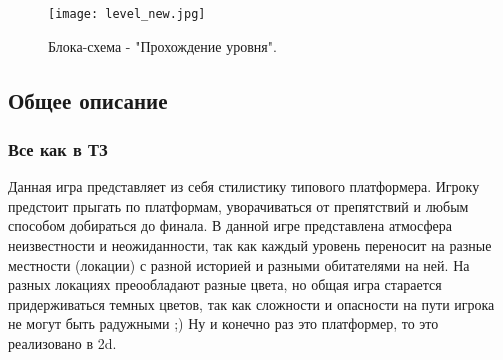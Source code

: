 \documentclass[a4paper,12pt]{article}
\begin{document}
    \begin{figure}[H] %
    \centering
    \texttt{[image: level\_new.jpg]} %
    \caption{Блока-схема - "Прохождение уровня".}
    \label{fig:player_character}
    \end{figure}

\subsection{Общее описание}


\subsubsection{Все как в ТЗ}

Данная игра представляет из себя стилистику типового платформера. Игроку предстоит прыгать по платформам, уворачиваться от препятствий и любым способом добираться до финала. В данной игре представлена атмосфера неизвестности и неожиданности, так как каждый уровень переносит на разные местности (локации) с разной историей и разными обитателями на ней. На разных локациях преообладают разные цвета, но общая игра старается придерживаться темных цветов, так как сложности и опасности на пути игрока не могут быть радужными ;) Ну и конечно раз это платформер, то это реализовано в 2d. 
\end{document}
